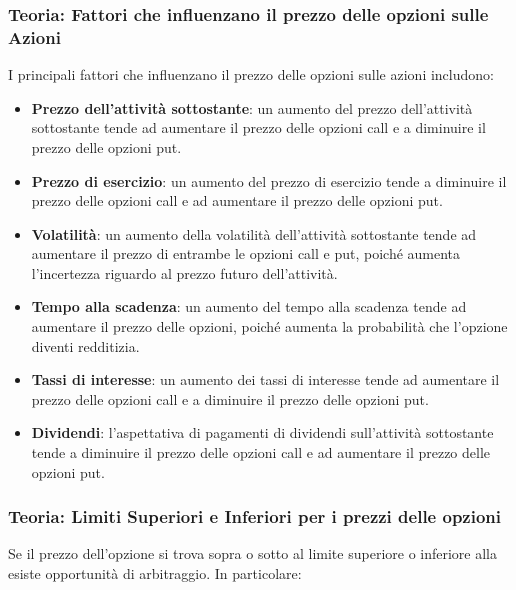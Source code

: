 \documentclass[12pt,a4paper]{report}
\begin{document}
\subsubsection{Teoria: Fattori che influenzano il prezzo delle opzioni sulle Azioni}

I principali fattori che influenzano il prezzo delle opzioni sulle azioni includono:

\begin{itemize}
    \item \textbf{Prezzo dell'attività sottostante}: un aumento del prezzo dell'attività sottostante tende ad aumentare il prezzo delle opzioni call e a diminuire il prezzo delle opzioni put.
    \item \textbf{Prezzo di esercizio}: un aumento del prezzo di esercizio tende a diminuire il prezzo delle opzioni call e ad aumentare il prezzo delle opzioni put.
    \item \textbf{Volatilità}: un aumento della volatilità dell'attività sottostante tende ad aumentare il prezzo di entrambe le opzioni call e put, poiché aumenta l'incertezza riguardo al prezzo futuro dell'attività.
    \item \textbf{Tempo alla scadenza}: un aumento del tempo alla scadenza tende ad aumentare il prezzo delle opzioni, poiché aumenta la probabilità che l'opzione diventi redditizia.
    \item \textbf{Tassi di interesse}: un aumento dei tassi di interesse tende ad aumentare il prezzo delle opzioni call e a diminuire il prezzo delle opzioni put.
    \item \textbf{Dividendi}: l'aspettativa di pagamenti di dividendi sull'attività sottostante tende a diminuire il prezzo delle opzioni call e ad aumentare il prezzo delle opzioni put.
\end{itemize}

\newpage
\subsubsection{Teoria: Limiti Superiori e Inferiori per i prezzi delle opzioni}

Se il prezzo dell'opzione si trova sopra o sotto al limite superiore o inferiore alla esiste opportunità di arbitraggio. In particolare:
\end{document}
